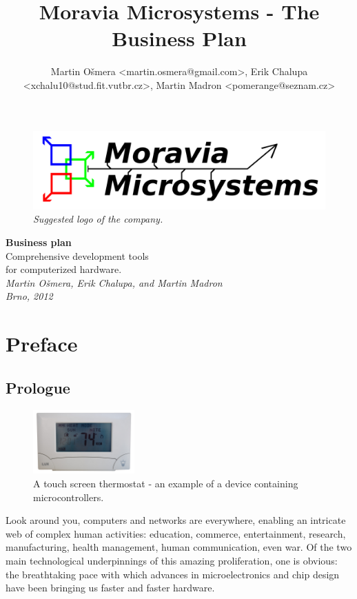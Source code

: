 \documentclass[a4paper,twoside,15pt]{book}
\title{Moravia Microsystems - The Business Plan}
\author{Martin Ošmera <martin.osmera@gmail.com>, Erik Chalupa <xchalu10@stud.fit.vutbr.cz>, Martin Madron <pomerange@seznam.cz>}
\begin{document}
\begin{titlepage}
    \begin{figure}[ht!]
        \centering{}
        \includegraphics[width=.9\textwidth]{images/Moravia_Microsystems.png}
        \caption{\textit{Suggested logo of the company.}}
    \end{figure}
    \begin{center}
        \fontsize{35.83pt}{60pt} \selectfont{}
        \textbf{Business plan}
        \\[2cm]
        \fontsize{25pt}{30pt} \selectfont{}
        Comprehensive development tools\\
        for computerized hardware.
        \\[1cm]
        \fontsize{14.4pt}{20pt} \selectfont{}
        \textit{Martin Ošmera, Erik Chalupa, and Martin Madron \\ Brno, 2012}
    \end{center}
\end{titlepage}

\tableofcontents

\chapter{Preface}
    \section{Prologue}
        \begin{figure}
            \centering{}
            \includegraphics[width=110pt]{images/Lux_Products_Touch_Screen_Thermostat.jpg}
            \caption{A touch screen thermostat - an example of a device containing microcontrollers.}
        \end{figure}
        Look around you, computers and networks are everywhere, enabling an intricate web of complex human activities: education, commerce, entertainment, research, manufacturing, health management, human communication, even war. Of the two main technological underpinnings of this amazing proliferation, one is obvious: the breathtaking pace with which advances in microelectronics and chip design have been bringing us faster and faster hardware.
\end{document}
